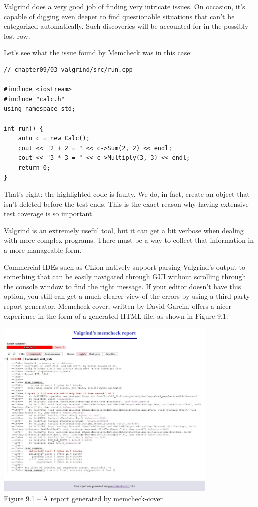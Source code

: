 Valgrind does a very good job of finding very intricate issues. On occasion, it's capable of digging even deeper to find questionable situations that can't be categorized automatically. Such discoveries will be accounted for in the possibly lost row.

Let's see what the issue found by Memcheck was in this case:

\begin{lstlisting}[style=styleCXX]
// chapter09/03-valgrind/src/run.cpp

#include <iostream>
#include "calc.h"
using namespace std;

int run() {
	auto c = new Calc();
	cout << "2 + 2 = " << c->Sum(2, 2) << endl;
	cout << "3 * 3 = " << c->Multiply(3, 3) << endl;
	return 0;
}
\end{lstlisting}

That's right: the highlighted code is faulty. We do, in fact, create an object that isn't deleted before the test ends. This is the exact reason why having extensive test coverage is so important.

Valgrind is an extremely useful tool, but it can get a bit verbose when dealing with more complex programs. There must be a way to collect that information in a more manageable form.


Commercial IDEs such as CLion natively support parsing Valgrind's output to something that can be easily navigated through GUI without scrolling through the console window to find the right message. If your editor doesn't have this option, you still can get a much clearer view of the errors by using a third-party report generator. Memcheck-cover, written by David Garcin, offers a nicer experience in the form of a generated HTML file, as shown in Figure 9.1:

\begin{center}
\includegraphics[width=0.8\textwidth]{content/3/chapter9/images/1.jpg}\\
Figure 9.1 – A report generated by memcheck-cover
\end{center}


